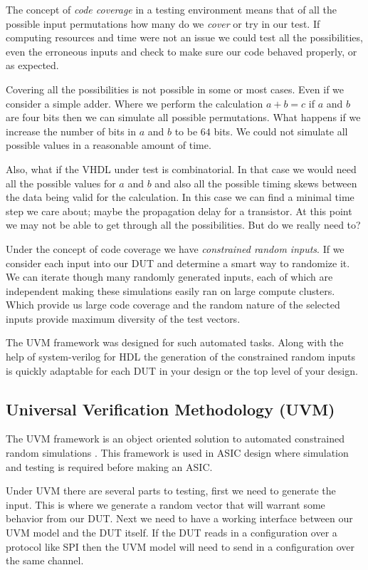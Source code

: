 The concept of \emph{code coverage} in a testing environment means that of all the possible input permutations how many do we \emph{cover} or try in our test. If computing resources and time were not an issue we could test all the possibilities, even the erroneous inputs and check to make sure our code behaved properly, or as expected. 

Covering all the possibilities is not possible in some or most cases. Even if we consider a simple adder. Where we perform the calculation $a+b=c$ if $a$ and $b$ are four bits then we can simulate all possible permutations. What happens if we increase the number of bits in $a$ and $b$ to be $64$ bits. We could not simulate all possible values in a reasonable amount of time.

Also, what if the \ac{VHDL} under test is combinatorial. In that case we would need all the possible values for $a$ and $b$ and also all the possible timing skews between the data being valid for the calculation. In this case we can find a minimal time step we care about; maybe the propagation delay for a transistor. At this point we may not be able to get through all the possibilities. But do we really need to?

Under the concept of code coverage we have \emph{constrained random inputs}. If we consider each input into our \ac{DUT} and determine a smart way to randomize it. We can iterate though many randomly generated inputs, each of which are independent making these simulations easily ran on large compute clusters. Which provide us large code coverage and the random nature of the selected inputs provide maximum diversity of the test vectors.  

The \ac{UVM} framework was designed for such automated tasks. Along with the help of system-verilog for \ac{HDL} the generation of the constrained random inputs is quickly adaptable for each \ac{DUT} in your design or the top level of your design.

\subsection{Universal Verification Methodology (UVM)}

The \ac{UVM} framework is an object oriented solution to automated constrained random simulations \cite{uvmref}. This framework is used in \ac{ASIC} design where simulation and testing is required before making an \ac{ASIC}.

Under \ac{UVM} there are several parts to testing, first we need to generate the input. This is where we generate a random vector that will warrant some behavior from our \ac{DUT}. Next we need to have a working interface between our \ac{UVM} model and the \ac{DUT} itself. If the \ac{DUT} reads in a configuration over a protocol like \ac{SPI} then the \ac{UVM} model will need to send in a configuration over the same channel. 

